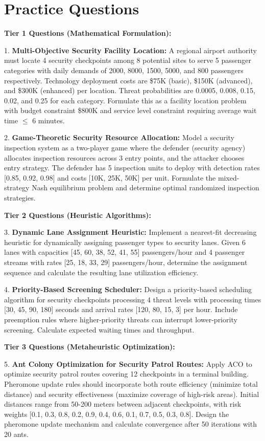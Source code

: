 \documentclass{article}
\begin{document}
\section{Practice Questions}

\textbf{Tier 1 Questions (Mathematical Formulation):}

1. \textbf{Multi-Objective Security Facility Location:} A regional airport authority must locate 4 security checkpoints among 8 potential sites to serve 5 passenger categories with daily demands of 2000, 8000, 1500, 5000, and 800 passengers respectively. Technology deployment costs are \$75K (basic), \$150K (advanced), and \$300K (enhanced) per location. Threat probabilities are 0.0005, 0.008, 0.15, 0.02, and 0.25 for each category. Formulate this as a facility location problem with budget constraint \$800K and service level constraint requiring average wait time $\leq$ 6 minutes.

2. \textbf{Game-Theoretic Security Resource Allocation:} Model a security inspection system as a two-player game where the defender (security agency) allocates inspection resources across 3 entry points, and the attacker chooses entry strategy. The defender has 5 inspection units to deploy with detection rates [0.85, 0.92, 0.98] and costs [10K, 25K, 50K] per unit. Formulate the mixed-strategy Nash equilibrium problem and determine optimal randomized inspection strategies.

\textbf{Tier 2 Questions (Heuristic Algorithms):}

3. \textbf{Dynamic Lane Assignment Heuristic:} Implement a nearest-fit decreasing heuristic for dynamically assigning passenger types to security lanes. Given 6 lanes with capacities [45, 60, 38, 52, 41, 55] passengers/hour and 4 passenger streams with rates [25, 18, 33, 29] passengers/hour, determine the assignment sequence and calculate the resulting lane utilization efficiency.

4. \textbf{Priority-Based Screening Scheduler:} Design a priority-based scheduling algorithm for security checkpoints processing 4 threat levels with processing times [30, 45, 90, 180] seconds and arrival rates [120, 80, 15, 3] per hour. Include preemption rules where higher-priority threats can interrupt lower-priority screening. Calculate expected waiting times and throughput.

\textbf{Tier 3 Questions (Metaheuristic Optimization):}

5. \textbf{Ant Colony Optimization for Security Patrol Routes:} Apply ACO to optimize security patrol routes covering 12 checkpoints in a terminal building. Pheromone update rules should incorporate both route efficiency (minimize total distance) and security effectiveness (maximize coverage of high-risk areas). Initial distances range from 50-200 meters between adjacent checkpoints, with risk weights [0.1, 0.3, 0.8, 0.2, 0.9, 0.4, 0.6, 0.1, 0.7, 0.5, 0.3, 0.8]. Design the pheromone update mechanism and calculate convergence after 50 iterations with 20 ants.
\end{document}
